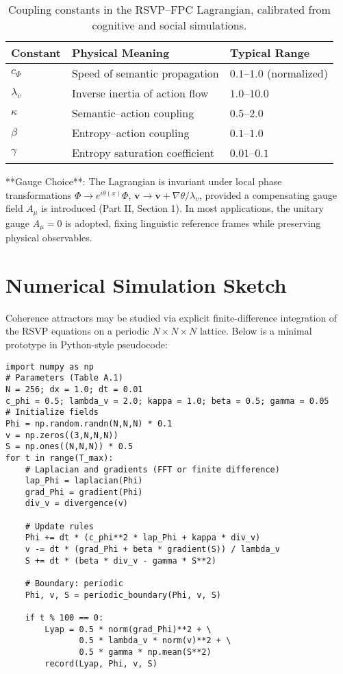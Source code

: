 \documentclass[12pt,a4paper]{article}
\begin{document}
\begin{table}[h]
\centering
\begin{tabular}{@{}lll@{}}
\toprule
\textbf{Constant} & \textbf{Physical Meaning} & \textbf{Typical Range} \\
\midrule
$c_\Phi$ & Speed of semantic propagation & $0.1$--$1.0$ (normalized) \\
$\lambda_v$ & Inverse inertia of action flow & $1.0$--$10.0$ \\
$\kappa$ & Semantic--action coupling & $0.5$--$2.0$ \\
$\beta$ & Entropy--action coupling & $0.1$--$1.0$ \\
$\gamma$ & Entropy saturation coefficient & $0.01$--$0.1$ \\
\bottomrule
\end{tabular}
\caption{Coupling constants in the RSVP--FPC Lagrangian, calibrated from cognitive and social simulations.}
\label{tab:couplings}
\end{table}

**Gauge Choice**: The Lagrangian is invariant under local phase transformations $\Phi \to e^{i\theta(x)}\Phi$, $\bm{v} \to \bm{v} + \nabla \theta / \lambda_v$, provided a compensating gauge field $A_\mu$ is introduced (Part II, Section 1). In most applications, the unitary gauge $A_\mu = 0$ is adopted, fixing linguistic reference frames while preserving physical observables.

\section{Numerical Simulation Sketch}
Coherence attractors may be studied via explicit finite-difference integration of the RSVP equations on a periodic $N \times N \times N$ lattice. Below is a minimal prototype in Python-style pseudocode:
\begin{verbatim}
import numpy as np
# Parameters (Table A.1)
N = 256; dx = 1.0; dt = 0.01
c_phi = 0.5; lambda_v = 2.0; kappa = 1.0; beta = 0.5; gamma = 0.05
# Initialize fields
Phi = np.random.randn(N,N,N) * 0.1
v = np.zeros((3,N,N,N))
S = np.ones((N,N,N)) * 0.5
for t in range(T_max):
    # Laplacian and gradients (FFT or finite difference)
    lap_Phi = laplacian(Phi)
    grad_Phi = gradient(Phi)
    div_v = divergence(v)
   
    # Update rules
    Phi += dt * (c_phi**2 * lap_Phi + kappa * div_v)
    v -= dt * (grad_Phi + beta * gradient(S)) / lambda_v
    S += dt * (beta * div_v - gamma * S**2)
   
    # Boundary: periodic
    Phi, v, S = periodic_boundary(Phi, v, S)
   
    if t % 100 == 0:
        Lyap = 0.5 * norm(grad_Phi)**2 + \
               0.5 * lambda_v * norm(v)**2 + \
               0.5 * gamma * np.mean(S**2)
        record(Lyap, Phi, v, S)
\end{verbatim}
\end{document}
